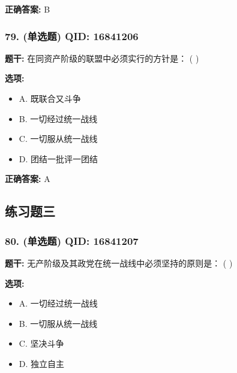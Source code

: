 \documentclass[12pt,UTF8]{ctexart}
\begin{document}
\textbf{正确答案:}
B

\vspace{0.3em}\hrulefill\vspace{0.7em}

\subsubsection*{79. (单选题) \small QID: 16841206}

\textbf{题干:}
在同资产阶级的联盟中必须实行的方针是： ( )

\textbf{选项:}
\begin{itemize}[leftmargin=*]

  \item A. 既联合又斗争

  \item B. 一切经过统一战线

  \item C. 一切服从统一战线

  \item D. 团结一批评一团结

\end{itemize}

\textbf{正确答案:}
A

\vspace{0.3em}\hrulefill\vspace{0.7em}

\subsection*{练习题三}

\subsubsection*{80. (单选题) \small QID: 16841207}

\textbf{题干:}
无产阶级及其政党在统一战线中必须坚持的原则是： ( )

\textbf{选项:}
\begin{itemize}[leftmargin=*]

  \item A. 一切经过统一战线

  \item B. 一切服从统一战线

  \item C. 坚决斗争

  \item D. 独立自主

\end{itemize}
\end{document}
